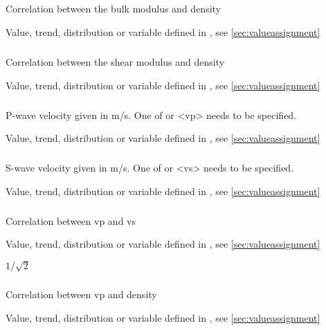 {\subparagraph{}
 \slist
   \item \Description Correlation between the bulk modulus and density
   \item \Argument Value, trend, distribution or variable defined in , see \autoref{sec:valueassignment}
   \item {}
 \elist

\subparagraph{}
 \slist
   \item \Description Correlation between the shear modulus and density
   \item \Argument Value, trend, distribution or variable defined in , see \autoref{sec:valueassignment}
   \item {}
 \elist

\subparagraph{}
 \slist
   \item \Description P-wave velocity given in m/s. One of  or <vp> needs to be specified.
   \item \Argument Value, trend, distribution or variable defined in , see \autoref{sec:valueassignment}
   \item \Default
 \elist

\subparagraph{}
 \slist
   \item \Description S-wave velocity given in m/s. One of  or <vs> needs to be specified.
   \item \Argument Value, trend, distribution or variable defined in , see \autoref{sec:valueassignment}
   \item \Default
 \elist

\subparagraph{}
 \slist
   \item \Description Correlation between vp and vs
   \item \Argument Value, trend, distribution or variable defined in , see \autoref{sec:valueassignment}
   \item \Default $1/\sqrt{2}$
 \elist

\subparagraph{}
 \slist
   \item \Description Correlation between vp and density
   \item \Argument Value, trend, distribution or variable defined in , see \autoref{sec:valueassignment}
   \item {}
 \elist

}
